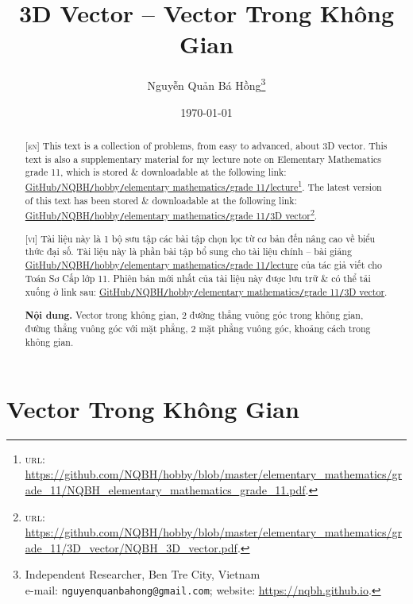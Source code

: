 \documentclass{article}
\title{3D Vector -- Vector Trong Không Gian}
\author{Nguyễn Quản Bá Hồng\footnote{Independent Researcher, Ben Tre City, Vietnam\\e-mail: \texttt{nguyenquanbahong@gmail.com}; website: \url{https://nqbh.github.io}.}}
\date{\today}
\numberwithin{equation}{section}
\begin{document}
\maketitle
\begin{abstract}
	\textsc{[en]} This text is a collection of problems, from easy to advanced, about 3D vector. This text is also a supplementary material for my lecture note on Elementary Mathematics grade 11, which is stored \& downloadable at the following link: \href{https://github.com/NQBH/hobby/blob/master/elementary_mathematics/grade_11/NQBH_elementary_mathematics_grade_11.pdf}{GitHub\texttt{/}NQBH\texttt{/}hobby\texttt{/}elementary mathematics\texttt{/}grade 11\texttt{/}lecture}\footnote{\textsc{url}: \url{https://github.com/NQBH/hobby/blob/master/elementary_mathematics/grade_11/NQBH_elementary_mathematics_grade_11.pdf}.}. The latest version of this text has been stored \& downloadable at the following link: \href{https://github.com/NQBH/hobby/blob/master/elementary_mathematics/grade_11/3D_vector/NQBH_3D_vector.pdf}{GitHub\texttt{/}NQBH\texttt{/}hobby\texttt{/}elementary mathematics\texttt{/}grade 11\texttt{/}3D vector}\footnote{\textsc{url}: \url{https://github.com/NQBH/hobby/blob/master/elementary_mathematics/grade_11/3D_vector/NQBH_3D_vector.pdf}.}.
	\vspace{2mm}
	
	\textsc{[vi]} Tài liệu này là 1 bộ sưu tập các bài tập chọn lọc từ cơ bản đến nâng cao về biểu thức đại số. Tài liệu này là phần bài tập bổ sung cho tài liệu chính -- bài giảng \href{https://github.com/NQBH/hobby/blob/master/elementary_mathematics/grade_11/NQBH_elementary_mathematics_grade_11.pdf}{GitHub\texttt{/}NQBH\texttt{/}hobby\texttt{/}elementary mathematics\texttt{/}grade 11\texttt{/}lecture} của tác giả viết cho Toán Sơ Cấp lớp 11. Phiên bản mới nhất của tài liệu này được lưu trữ \& có thể tải xuống ở link sau: \href{https://github.com/NQBH/hobby/blob/master/elementary_mathematics/grade_11/3D_vector/NQBH_3D_vector.pdf}{GitHub\texttt{/}NQBH\texttt{/}hobby\texttt{/}elementary mathematics\texttt{/}grade 11\texttt{/}3D vector}.
	
	\textsf{\textbf{Nội dung.} Vector trong không gian, 2 đường thẳng vuông góc trong không gian, đường thẳng vuông góc với mặt phẳng, 2 mặt phẳng vuông góc, khoảng cách trong không gian.}
\end{abstract}
\tableofcontents
\newpage


\section{Vector Trong Không Gian}
\end{document}
